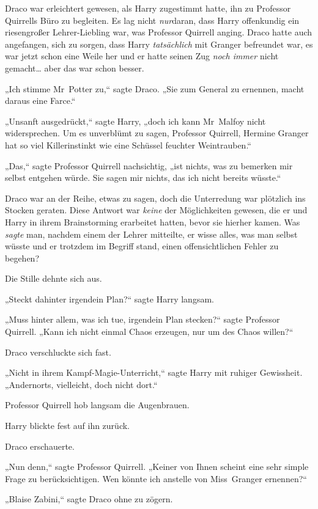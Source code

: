{Draco war erleichtert gewesen, als Harry zugestimmt hatte, ihn zu Professor Quirrells Büro zu begleiten. Es lag nicht \emph{nur}daran, dass Harry offenkundig ein riesengroßer Lehrer-Liebling war, was Professor Quirrell anging. Draco hatte auch angefangen, sich zu sorgen, dass Harry \emph{tatsächlich} mit Granger befreundet war, es war jetzt schon eine Weile her und er hatte seinen Zug \emph{noch immer} nicht gemacht… aber das war schon besser.

„Ich stimme Mr~Potter zu,“ sagte Draco. „Sie zum General zu ernennen, macht daraus eine Farce.“

„Unsanft ausgedrückt,“ sagte Harry, „doch ich kann Mr~Malfoy nicht widersprechen. Um es unverblümt zu sagen, Professor Quirrell, Hermine Granger hat so viel Killerinstinkt wie eine Schüssel feuchter Weintrauben.“

„Das,“ sagte Professor Quirrell nachsichtig, „ist nichts, was zu bemerken mir selbst entgehen würde. Sie sagen mir nichts, das ich nicht bereits wüsste.“

Draco war an der Reihe, etwas zu sagen, doch die Unterredung war plötzlich ins Stocken geraten. Diese Antwort war \emph{keine} der Möglichkeiten gewesen, die er und Harry in ihrem Brainstorming erarbeitet hatten, bevor sie hierher kamen. Was \emph{sagte} man, nachdem einem der Lehrer mitteilte, er wisse alles, was man selbst wüsste und er trotzdem im Begriff stand, einen offensichtlichen Fehler zu begehen?

Die Stille dehnte sich aus.

„Steckt dahinter irgendein Plan?“ sagte Harry langsam.

„Muss hinter allem, was ich tue, irgendein Plan stecken?“ sagte Professor Quirrell. „Kann ich nicht einmal Chaos erzeugen, nur um des Chaos willen?“

Draco verschluckte sich fast.

„Nicht in ihrem Kampf-Magie-Unterricht,“ sagte Harry mit ruhiger Gewissheit. „Andernorts, vielleicht, doch nicht dort.“

Professor Quirrell hob langsam die Augenbrauen.

Harry blickte fest auf ihn zurück.

Draco erschauerte.

„Nun denn,“ sagte Professor Quirrell. „Keiner von Ihnen scheint eine sehr simple Frage zu berücksichtigen. Wen könnte ich anstelle von Miss~Granger ernennen?“

„Blaise Zabini,“ sagte Draco ohne zu zögern.

}
